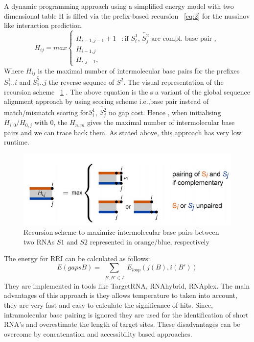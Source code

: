 \documentclass[twoside,a4paper]{report}
\begin{document}
	
	 A dynamic programming approach using a simplified energy model with two dimensional table H is filled via the prefix-based recursion ~\ref{eq:2} for the nussinov like interaction prediction.\\
	 \begin{equation}
	 \label{eq:2}
	H_{ij} = max \begin{cases}
	H_{i-1,j-1}+1 & : \text{if $S^1_i$, $\overleftarrow{S^2_j}$ are compl. base pair }, \\
	H_{i-1,j} \\
	H_{i,j-1} ,
	\end{cases}
	\end{equation}
	Where $H_{ij}$ is the maximal number of intermolecular base pairs for the prefixes $S^1_1..i$	and $\overleftarrow{S^2_1..j}$ the reverse sequnce of $S^2$. The visual representation of the recursion scheme ~\ref{fig:hybrid} . The above equation is the s a variant of the global sequence alignment approach by \citep{needleman1970general} using scoring scheme i.e.,base pair instead of match/mismatch scoring for$S^1_i$, $\overleftarrow{S^2_j}$ no gap cost. Hence , when initialising $ H_{i,0} / H_{0,j} $ with 0, the $H_{n,m} $ gives the maximal number of intermolecular base pairs and we can trace back them. As stated above, this approach has very low runtime.\\
	 \begin{figure}[h]
		\includegraphics[width=0.8\linewidth]{hybrid}
		\centering
		\caption{Recursion scheme to maximize intermolecular base pairs between two RNAs $S1$ and $S2$ represented in orange/blue, respectively} 
		\label{fig:hybrid}
	\end{figure}
	The energy for RRI can be calculated as follows:
	\begin{equation*}
		E(gaps B) = \sum _{\substack {B,B' \in I}} E_{loop}(j(B),i(B'))
	\end{equation*}
	They are implemented in tools like TargetRNA, RNAhybrid, RNAplex. The main advantages of this approach is they allows temperature to taken into account, they are very fast and easy to calculate the significance of hits.  Since,  intramolecular base pairing is ignored they are used for the identification of short RNA's and overestimate the length of target sites. These disadvantages can be overcome by concatenation and accessibility based approaches.\\ 
	
\end{document}
